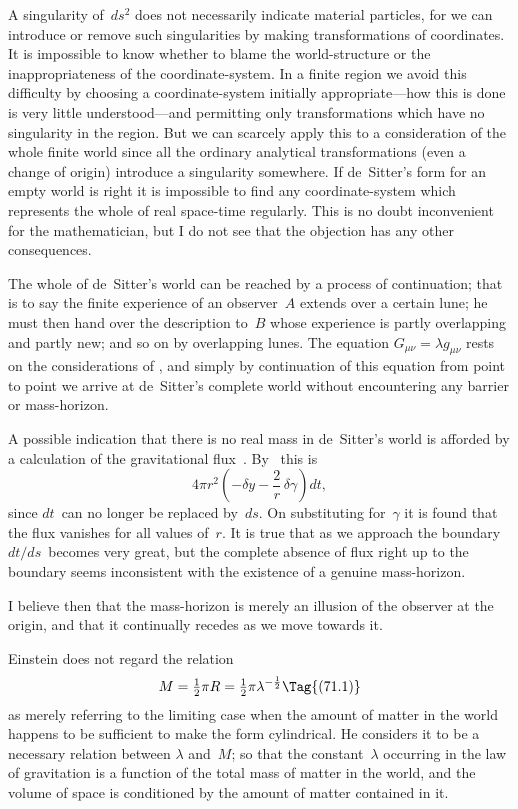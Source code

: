 \documentclass[12pt]{book}
\begin{document}
A singularity of~$ds^{2}$ does not necessarily indicate material particles, for
we can introduce or remove such singularities by making transformations of
coordinates. It is impossible to know whether to blame the world\hyp{}structure
or the inappropriateness of the coordinate\hyp{}system. In a finite region we avoid
this difficulty by choosing a coordinate\hyp{}system initially appropriate---how this
is done is very little understood---and permitting only transformations which
have no singularity in the region. But we can scarcely apply this to a
consideration of the whole finite world since all the ordinary analytical transformations
%
%
(even a change of origin) introduce a singularity somewhere. If
de~Sitter's form for an empty world is right it is impossible to find any
coordinate\hyp{}system which represents the whole of real space-time regularly.
This is no doubt inconvenient for the mathematician, but I do not see that
the objection has any other consequences.

The whole of de~Sitter's world can be reached by a process of continuation;
that is to say the finite experience of an observer~$A$ extends over a certain
lune; he must then hand over the description to~$B$ whose experience is partly
overlapping and partly new; and so on by overlapping lunes. The equation
$G_{\mu\nu} = \lambda g_{\mu\nu}$ rests on the considerations of , and simply by continuation of
this equation from point to point we arrive at de~Sitter's complete world
without encountering any barrier or mass\hyp{}horizon.

A possible indication that there is no real mass in de~Sitter's world is
afforded by a calculation of the gravitational flux~. By~ this is
\[
4\pi r^{2} \left(-\delta y - \frac{2}{r}\, \delta\gamma\right) dt,
\]
since $dt$~can no longer be replaced by~$ds$. On substituting for~$\gamma$ it is found
that the flux vanishes for all values of~$r$. It is true that as we approach the
boundary $dt/ds$~becomes very great, but the complete absence of flux right up
to the boundary seems inconsistent with the existence of a genuine mass\hyp{}horizon.

I believe then that the mass\hyp{}horizon is merely an illusion of the observer
at the origin, and that it continually recedes as we move towards it.

%

Einstein does not regard the relation~
\[
M = \tfrac{1}{2}\pi R = \tfrac{1}{2}\pi \lambda^{-\frac{1}{2}}
\Tag{(71.1)}
\]
as merely referring to the limiting case when the amount of matter in the
world happens to be sufficient to make the form cylindrical. He considers it
to be a necessary relation between $\lambda$ and~$M$; so that the constant~$\lambda$ occurring
in the law of gravitation is a function of the total mass of matter in the world,
and the volume of space is conditioned by the amount of matter contained
in it.
\end{document}
